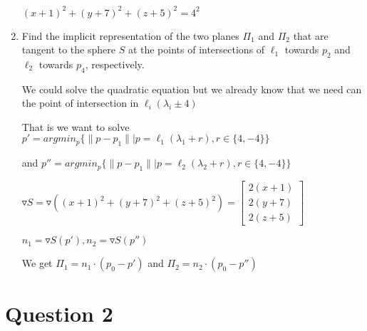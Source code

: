 \documentclass{article}
\begin{document}
\begin{enumerate}
        $(x + 1)^2 + (y + 7)^2 + (z + 5)^2 = 4^2$

        \item Find the implicit representation of the two planes $\Pi_1$ and $\Pi_2$ that are tangent to the sphere $S$ at the points of intersections of $\ell_1$ towards $p_2$ and $\ell_2$ towards $p_4$, respectively.
        
        We could solve the quadratic equation but we already know that we need can the point of intersection in $\ell_i(\lambda_i \pm 4)$

        That is we want to solve $p' = argmin_p \big \{ \| p - p_1 \| \big | p = \ell_1(\lambda_1 + r),  r \in \{4, -4\} \big \}$

        and $p'' = argmin_p \big \{ \| p - p_1 \| \big | p = \ell_2(\lambda_2 + r),  r \in \{4, -4\} \big \}$

        $\triangledown S = \triangledown((x + 1)^2 + (y + 7)^2 + (z + 5)^2) = \begin{bmatrix} 2(x+1) \\ 2(y + 7) \\ 2(z+ 5) \end{bmatrix}$

        $n_1 = \triangledown S(p'), n_2 = \triangledown S(p'')$

        We get $\Pi_1 = n_1 \cdot (p_0 - p')$ and $\Pi_2 = n_2 \cdot (p_0 - p'')$



    \end{enumerate}
    \section*{Question 2}
\end{document}
